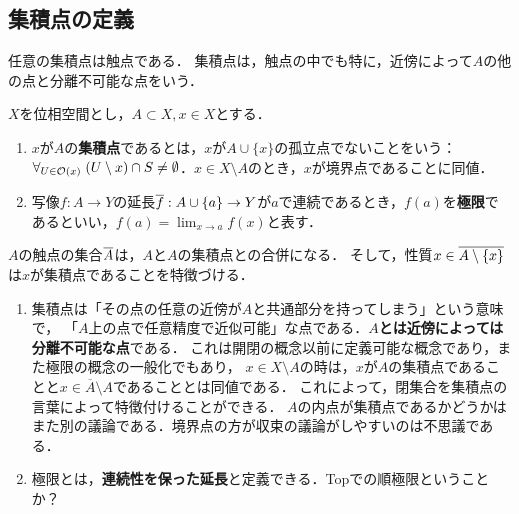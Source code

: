 \documentclass[uplatex,dvipdfmx]{jsreport}
\begin{document}
\subsection{集積点の定義}

\begin{tcolorbox}[colframe=ForestGreen, colback=ForestGreen!10!white,breakable,colbacktitle=ForestGreen!40!white,coltitle=black,fonttitle=\bfseries\sffamily,
title=]
    任意の集積点は触点である．
    集積点は，触点の中でも特に，近傍によって$A$の他の点と分離不可能な点をいう．
\end{tcolorbox}

\begin{definition}\label{def-accumulation-point}
    $X$を位相空間とし，$A\subset X,x\in X$とする．
    \begin{enumerate}
        \item $x$が$A$の\textbf{集積点}であるとは，$x$が$A\cup\{x\}$の孤立点でないことをいう：$\forall_{U\in\mathcal{O}(x)}\;(U\setminus x)\cap S\ne\emptyset$．$x\in X\setminus A$のとき，$x$が境界点であることに同値．
        \item 写像$f:A\to Y$の延長$\overline{f}:A\cup\{a\}\to Y$が$a$で連続であるとき，$f(a)$を\textbf{極限}であるといい，$f(a)=\lim_{x\to a}f(x)$と表す．
    \end{enumerate}
\end{definition}
\begin{remarks}[触点との違い]
    $A$の触点の集合$\overline{A}$は，$A$と$A$の集積点との合併になる．
    そして，性質$x\in\overline{A\setminus\{x\}}$は$x$が集積点であることを特徴づける．
\end{remarks}
\begin{remark}[まさかこんな捉え方があるとは]\mbox{}
    \begin{enumerate}
        \item 集積点は「その点の任意の近傍が$A$と共通部分を持ってしまう」という意味で，
        「$A$上の点で任意精度で近似可能」な点である．\textbf{$A$とは近傍によっては分離不可能な点}である．
        これは開閉の概念以前に定義可能な概念であり，また極限の概念の一般化でもあり，
        $x\in X\setminus A$の時は，$x$が$A$の集積点であることと$x\in\overline{A}\setminus A$であることとは同値である．
        これによって，閉集合を集積点の言葉によって特徴付けることができる．
        $A$の内点が集積点であるかどうかはまた別の議論である．境界点の方が収束の議論がしやすいのは不思議である．
        \item 極限とは，\textbf{連続性を保った延長}と定義できる．Topでの順極限ということか？
    \end{enumerate}
\end{remark}
\end{document}
